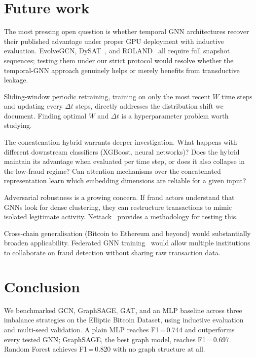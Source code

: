 \section{Future work}
\label{sec:future}

The most pressing open question is whether temporal GNN architectures
recover their published advantage under proper GPU deployment with
inductive evaluation.  EvolveGCN, DySAT~\citep{sankar2020}, and
ROLAND~\citep{you2022roland} all require full snapshot sequences;
testing them under our strict protocol would resolve whether the
temporal-GNN approach genuinely helps or merely benefits from
transductive leakage.

Sliding-window periodic retraining, training on only the most recent
$W$ time steps and updating every $\Delta t$ steps, directly addresses
the distribution shift we document.  Finding optimal $W$ and $\Delta t$
is a hyperparameter problem worth studying.

The concatenation hybrid warrants deeper investigation.  What happens
with different downstream classifiers (XGBoost, neural networks)?
Does the hybrid maintain its advantage when evaluated per time step,
or does it also collapse in the low-fraud regime?  Can attention
mechanisms over the concatenated representation learn which embedding
dimensions are reliable for a given input?

Adversarial robustness is a growing concern.  If fraud actors
understand that GNNs look for dense clustering, they can restructure
transactions to mimic isolated legitimate activity.
Nettack~\citep{zugner2018} provides a methodology for testing this.

Cross-chain generalisation (Bitcoin to Ethereum and beyond) would
substantially broaden applicability.  Federated GNN
training~\citep{he2021} would allow multiple institutions to
collaborate on fraud detection without sharing raw transaction data.


\section{Conclusion}
\label{sec:conclusion}

We benchmarked GCN, GraphSAGE, GAT, and an MLP baseline across three
imbalance strategies on the Elliptic Bitcoin Dataset, using inductive
evaluation and multi-seed validation.  A plain MLP reaches
F1\,=\,0.744 and outperforms every tested GNN; GraphSAGE, the best
graph model, reaches F1\,=\,0.697.  Random Forest achieves
F1\,=\,0.820 with no graph structure at all.

